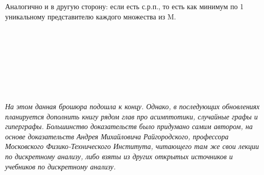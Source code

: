 \documentclass[12pt]{article}
\begin{document}
Аналогично и в другую сторону: если есть с.р.п., то есть как минимум по 1 уникальному представителю каждого множества из M.
\\
\\
\\
\\
\\
\\
\\
\\
\\





\textit{
На этом данная брошюра подошла к концу. Однако, в последующих обновлениях планируется дополнить книгу рядом глав про асимптотики, случайные графы и гиперграфы. Большинство доказательств было придумано самим автором, на основе доказательств Андрея Михайловича Райгородского, профессора Московского Физико-Технического Института, читающего там же свои лекции по дискретному анализу, либо взяты из других открытых источников и учебников по дискретному анализу. }


 
\end{document}
